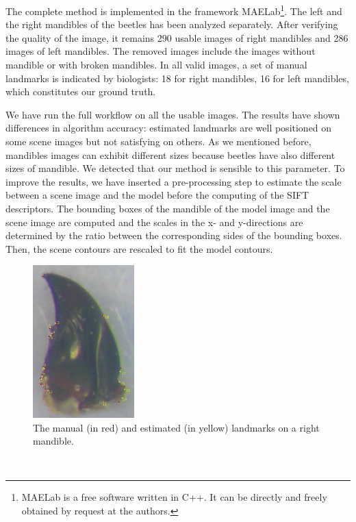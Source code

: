 \documentclass[twoside,twocolumn,10pt]{article}
\begin{document}
The complete method is implemented in the framework MAELab\footnote{MAELab
  is a free software written in C++. It can be directly and freely obtained by request
  at the authors.}. The left and the right mandibles of the beetles has been analyzed separately.
After verifying the quality of the image, it remains 290 usable images of right mandibles and 286 images of left mandibles.
The removed images include the images without mandible or with broken mandibles.
In all valid images, a set of manual landmarks is indicated by
biologists: 18 for right mandibles, 16 for left mandibles, which
constitutes our ground truth.

We have run the full workflow on all the usable images.
The results have shown differences in algorithm accuracy: estimated
landmarks are well positioned on some scene images but not satisfying
on others. As we mentioned before, mandibles images can exhibit
different sizes because beetles have also different sizes of
mandible. We detected that our method is sensible to this parameter.
To improve the results, we have inserted a pre-processing step to
estimate the scale between a scene image and the model before the
computing of the SIFT descriptors. The bounding boxes of the mandible
of the model image and the scene image are computed and the scales in the x-
and y-directions are determined by the ratio between the corresponding
sides of the bounding boxes. Then, the scene contours are rescaled to fit the model contours. \\
\begin{figure}[htbp]
\centering
\includegraphics[width=0.35\textwidth]{./images/md_rs}
\caption{The manual (in red) and estimated (in yellow) landmarks on a right mandible.}
\label{figresult}
\end{figure}~\\
\end{document}
